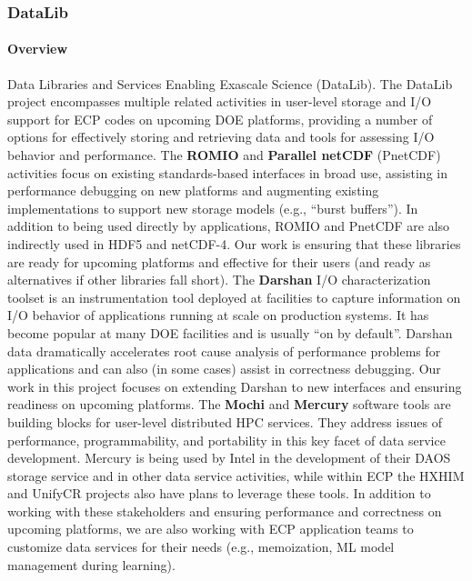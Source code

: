 \subsubsection{ DataLib} 

\paragraph{Overview} 

Data Libraries and Services Enabling Exascale Science (DataLib). The
DataLib project encompasses multiple related activities in user-level
storage and I/O support for ECP codes on upcoming DOE platforms,
providing a number of options for effectively storing and retrieving
data and tools for assessing I/O behavior and performance.
%
The \textbf{ROMIO} and \textbf{Parallel netCDF} (PnetCDF) activities
focus on existing standards-based interfaces in broad use, assisting
in performance debugging on new platforms and augmenting existing
implementations to support new storage models (e.g., “burst
buffers”). In addition to being used directly by applications, ROMIO
and PnetCDF are also indirectly used in HDF5 and netCDF-4. Our work is
ensuring that these libraries are ready for upcoming platforms and
effective for their users (and ready as alternatives if other
libraries fall short).
%
The \textbf{Darshan} I/O characterization toolset is an instrumentation tool
deployed at facilities to capture information on I/O behavior of
applications running at scale on production systems. It has become
popular at many DOE facilities and is usually “on by default”. Darshan
data dramatically accelerates root cause analysis of performance
problems for applications and can also (in some cases) assist in
correctness debugging. Our work in this project focuses on extending
Darshan to new interfaces and ensuring readiness on upcoming
platforms.
%
The \textbf{Mochi} and \textbf{Mercury} software tools are building blocks for
user-level distributed HPC services. They address issues of
performance, programmability, and portability in this key facet of
data service development. Mercury is being used by Intel in the
development of their DAOS storage service and in other data service
activities, while within ECP the HXHIM and UnifyCR projects also have
plans to leverage these tools. In addition to working with these
stakeholders and ensuring performance and correctness on upcoming
platforms, we are also working with ECP application teams to customize
data services for their needs (e.g., memoization, ML model management
during learning).

